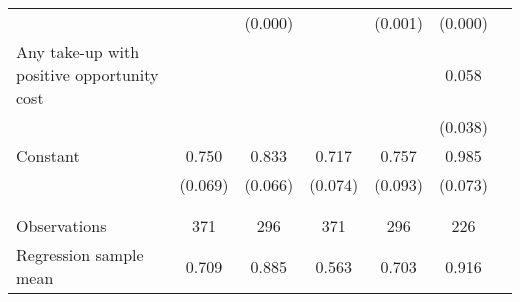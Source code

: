 \begin{tabular}{l*{6}{c}}
                    &                     &     (0.000)         &                     &     (0.001)         &     (0.000)         \\
[1em]
Any take-up with positive opportunity cost&                     &                     &                     &                     &       0.058         \\
                    &                     &                     &                     &                     &     (0.038)         \\
[1em]
Constant            &       0.750\sym{***}&       0.833\sym{***}&       0.717\sym{***}&       0.757\sym{***}&       0.985\sym{***}\\
                    &     (0.069)         &     (0.066)         &     (0.074)         &     (0.093)         &     (0.073)         \\
 \\[-1.8ex] \hline  \\[-1.8ex]
Observations        &         371         &         296         &         371         &         296         &         226         \\
Regression sample mean&       0.709         &       0.885         &       0.563         &       0.703         &       0.916         \\
\hline\hline \end{tabular} 
